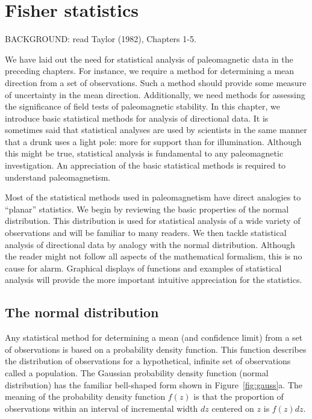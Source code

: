 \chapter{Fisher statistics}

BACKGROUND: 
read Taylor (1982), Chapters 1-5.  \nocite{taylor82}
\vskip 12pt



We have laid out the need for statistical analysis of paleomagnetic data in  the preceding chapters.
For instance, we require a method for determining a mean direction from a set of observations. Such a
method should provide some measure of uncertainty in the mean direction. Additionally, we need methods
for assessing the significance of field tests of paleomagnetic stability. In this chapter, we introduce basic statistical methods for analysis of
directional data. It is sometimes said that statistical analyses are used by
scientists in the same manner that a drunk uses a light pole: more for support than for illumination. Although
this might be true, statistical analysis is fundamental to any paleomagnetic investigation. An appreciation of
the basic statistical methods is required to understand paleomagnetism.

Most of the statistical methods used in paleomagnetism have direct analogies to ``planar'' statistics. We
begin by reviewing the basic properties of the 
normal distribution.
This distribution is used for statistical analysis of a wide variety of observations and will be familiar to many
readers.  We then tackle statistical analysis of directional data  by analogy with the normal distribution. Although
the reader might not follow all aspects of the mathematical formalism, this is no cause for alarm.
Graphical displays of functions and examples of statistical analysis will provide the more important intuitive
appreciation for the statistics.

\section {The normal distribution}

Any statistical method for determining a mean (and confidence limit) from a set of observations is based on
a probability density function. This function describes the distribution of observations for a hypothetical,
infinite set of observations called a population. The Gaussian probability density function 
(normal distribution)
has the familiar bell-shaped form shown in Figure~\ref{fig:gauss}a.   The meaning of the probability density function
$f(z)$  is that the proportion of observations within an interval of incremental width $dz$  centered on $z$ is $f(z) dz$.

